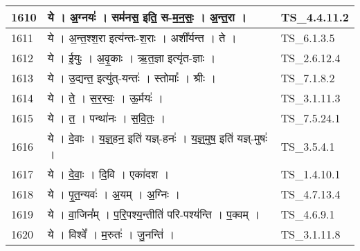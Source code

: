 \documentclass[17pt]{extarticle}
\begin{document}
\begin{longtable}{||p{0.4in}||p{4.9in}||p{0.9in}||}
    \hline
        
    1610 & ये   ।   अ॒ग्नयः॑   ।   सम॑नस॒ इति॒ स{-}म॒न॒सः॒   ।   अ॒न्त॒रा   ।    & TS\_4.4.11.2       \\
    
    \hline
        
    1611 & ये   ।   अ॒न्त॒श्श॒रा इत्य॑न्तः{-}श॒राः   ।   अशी᳚र्यन्त   ।   ते   ।    & TS\_6.1.3.5       \\
    
    \hline
        
    1612 & ये   ।   ई॒युः   ।   अ॒वृ॒काः   ।   ऋ॒त॒ज्ञा इत्यृ॑त{-}ज्ञाः   ।    & TS\_2.6.12.4       \\
    
    \hline
        
    1613 & ये   ।   उ॒द्यन्त॒ इत्यु॑त्{-}यन्तः॑   ।   स्तोमाः᳚   ।   श्रीः   ।    & TS\_7.1.8.2       \\
    
    \hline
        
    1614 & ये   ।   ते॒   ।   स॒र॒स्वः॒   ।   ऊ॒र्मयः॑   ।    & TS\_3.1.11.3       \\
    
    \hline
        
    1615 & ये   ।   त॒   ।   पन्था॑नः   ।   स॒वि॒तः॒   ।    & TS\_7.5.24.1       \\
    
    \hline
        
    1616 & ये   ।   दे॒वाः   ।   य॒ज्ञ्॒हन॒ इति॑ यज्ञ्{-}हनः॑   ।   य॒ज्ञ्॒मुष॒ इति॑ यज्ञ्{-}मुषः॑   ।    & TS\_3.5.4.1       \\
    
    \hline
        
    1617 & ये   ।   दे॒वाः॒   ।   दि॒वि   ।   एका॑दश   ।    & TS\_1.4.10.1       \\
    
    \hline
        
    1618 & ये   ।   पृ॒त॒न्यवः॑   ।   अ॒यम्   ।   अ॒ग्निः   ।    & TS\_4.7.13.4       \\
    
    \hline
        
    1619 & ये   ।   वा॒जिन᳚म्   ।   प॒रि॒पश्य॒न्तीति॑ परि{-}पश्य॑न्ति   ।   प॒क्वम्   ।    & TS\_4.6.9.1       \\
    
    \hline
        
    1620 & ये   ।   विश्वे᳚   ।   म॒रुतः॑   ।   जु॒नन्ति॑   ।    & TS\_3.1.11.8       \\
    

\end{longtable}
\end{document}

